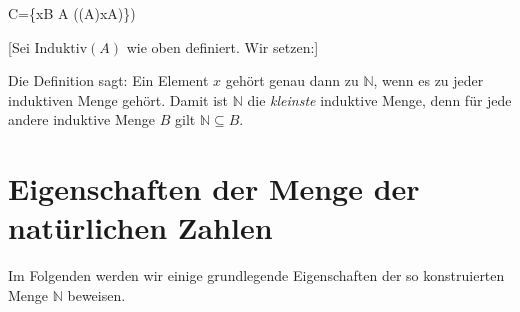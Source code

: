 \documentclass[main.tex]{subfiles}
\begin{document}
\begin{tabproofwide}
    {}

    {}
  \proofstepwide{}{}%
    {C=\{x\in B \mid \forall A ((A)\rightarrow x\in A)\})}%
    {}
\end{tabproofwide}


[Sei \(\mathrm{Induktiv}(A)\) wie oben definiert.  Wir setzen:]

\begin{remark}
  Die Definition sagt: Ein Element \(x\) gehört genau dann zu \(\mathbb{N}\), wenn es zu jeder induktiven Menge gehört.  Damit ist \(\mathbb{N}\) die \emph{kleinste} induktive Menge, denn für jede andere induktive Menge \(B\) gilt \(\mathbb{N} \subseteq B\).
\end{remark}

\begin{tabproofwide}
\end{tabproofwide}


\section{Eigenschaften der Menge der natürlichen Zahlen}

Im Folgenden werden wir einige grundlegende Eigenschaften der so konstruierten Menge \(\mathbb{N}\) beweisen.
\end{document}
